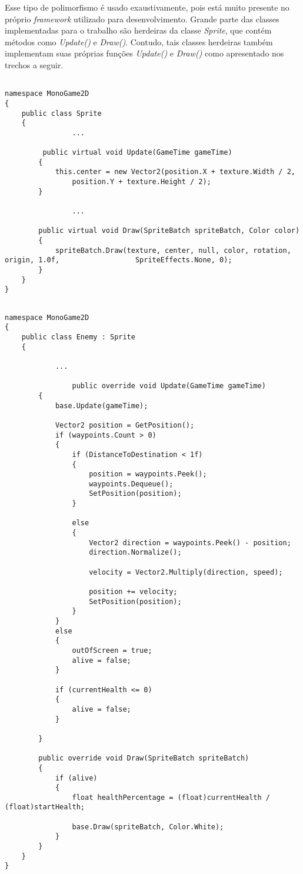 \documentclass[rel_mlp]{iiufrgs}
\begin{document}
Esse tipo de polimorfismo é usado exaustivamente, pois está muito presente no próprio \textit{framework} utilizado para desenvolvimento. Grande parte das classes implementadas para o trabalho são herdeiras da classe \textit{Sprite}, que contém métodos como \textit{Update()} e \textit{Draw()}. Contudo, tais classes herdeiras também implementam suas próprias funções \textit{Update()} e \textit{Draw()} como apresentado nos trechos a seguir.

\begin{lstlisting}[caption=Trecho de código C\# retirado da implementação deste trabalho, label=lst:test]

namespace MonoGame2D
{
    public class Sprite
    {
				...

		 public virtual void Update(GameTime gameTime)
        {
            this.center = new Vector2(position.X + texture.Width / 2,
                position.Y + texture.Height / 2);
        }

				...

        public virtual void Draw(SpriteBatch spriteBatch, Color color)
        {
            spriteBatch.Draw(texture, center, null, color, rotation, origin, 1.0f, 					SpriteEffects.None, 0);
        }
    }
}

\end{lstlisting}

\begin{lstlisting}[caption=Trecho de código C\# retirado da implementação deste trabalho, label=lst:test]

namespace MonoGame2D
{
    public class Enemy : Sprite
    {
		
			...
			
			    public override void Update(GameTime gameTime)
        {
            base.Update(gameTime);

            Vector2 position = GetPosition();
            if (waypoints.Count > 0)
			{
				if (DistanceToDestination < 1f)
				{
					position = waypoints.Peek();
					waypoints.Dequeue();
                    SetPosition(position);
				}

				else
				{
					Vector2 direction = waypoints.Peek() - position;
					direction.Normalize();

					velocity = Vector2.Multiply(direction, speed);

					position += velocity;
                    SetPosition(position);
				}
			}
			else
			{
				outOfScreen = true;
				alive = false;
			}

			if (currentHealth <= 0)
			{
				alive = false;
			}
                
        }

        public override void Draw(SpriteBatch spriteBatch)
        {
            if (alive)
            {
                float healthPercentage = (float)currentHealth / (float)startHealth;              

                base.Draw(spriteBatch, Color.White);
            }      
        }
	}
}

\end{lstlisting}
\end{document}
